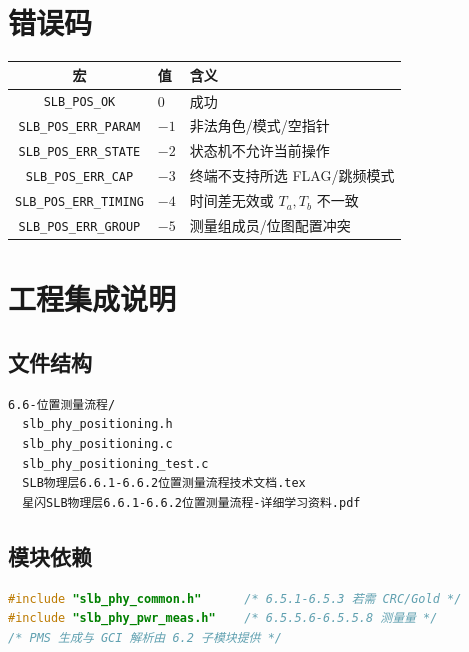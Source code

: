 \documentclass[11pt,a4paper]{ctexart}
\begin{document}
\section{错误码}

\begin{table}[h]
\centering
\begin{tabular}{cll}
\toprule
\textbf{宏} & \textbf{值} & \textbf{含义} \\
\midrule
\texttt{SLB\_POS\_OK} & 0 & 成功 \\
\texttt{SLB\_POS\_ERR\_PARAM} & $-1$ & 非法角色/模式/空指针 \\
\texttt{SLB\_POS\_ERR\_STATE} & $-2$ & 状态机不允许当前操作 \\
\texttt{SLB\_POS\_ERR\_CAP} & $-3$ & 终端不支持所选 FLAG/跳频模式 \\
\texttt{SLB\_POS\_ERR\_TIMING} & $-4$ & 时间差无效或 $T_a,T_b$ 不一致 \\
\texttt{SLB\_POS\_ERR\_GROUP} & $-5$ & 测量组成员/位图配置冲突 \\
\bottomrule
\end{tabular}
\end{table}

\section{工程集成说明}

\subsection{文件结构}

\begin{lstlisting}
6.6-位置测量流程/
  slb_phy_positioning.h
  slb_phy_positioning.c
  slb_phy_positioning_test.c
  SLB物理层6.6.1-6.6.2位置测量流程技术文档.tex
  星闪SLB物理层6.6.1-6.6.2位置测量流程-详细学习资料.pdf
\end{lstlisting}

\subsection{模块依赖}

\begin{lstlisting}[language=C]
#include "slb_phy_common.h"      /* 6.5.1-6.5.3 若需 CRC/Gold */
#include "slb_phy_pwr_meas.h"    /* 6.5.5.6-6.5.5.8 测量量 */
/* PMS 生成与 GCI 解析由 6.2 子模块提供 */
\end{lstlisting}
\end{document}
